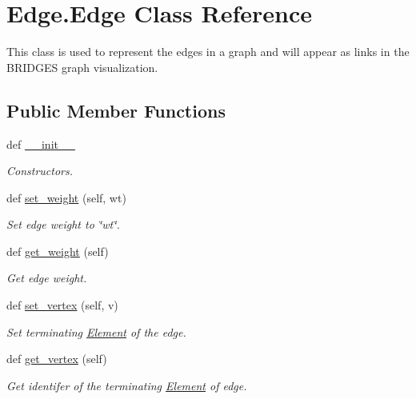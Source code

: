 \hypertarget{class_edge_1_1_edge}{}\section{Edge.\+Edge Class Reference}
\label{class_edge_1_1_edge}


This class is used to represent the edges in a graph and will appear as links in the B\+R\+I\+D\+G\+E\+S graph visualization.  


\subsection*{Public Member Functions}
\begin{DoxyCompactItemize}
\item 
def \hyperlink{class_edge_1_1_edge_a8852f95a1f4a541b359c0d498aeea264}{\+\_\+\+\_\+init\+\_\+\+\_\+}
\begin{DoxyCompactList}\small\item\em Constructors. \end{DoxyCompactList}\item 
def \hyperlink{class_edge_1_1_edge_a00a5bb637975a294dfabc0472ccea283}{set\+\_\+weight} (self, wt)
\begin{DoxyCompactList}\small\item\em Set edge weight to \char`\"{}wt\char`\"{}. \end{DoxyCompactList}\item 
def \hyperlink{class_edge_1_1_edge_a35a3ba198529f194a234c7aaeb1f5dce}{get\+\_\+weight} (self)
\begin{DoxyCompactList}\small\item\em Get edge weight. \end{DoxyCompactList}\item 
def \hyperlink{class_edge_1_1_edge_a8ff5ba90a5163d16d2027dc854cb912f}{set\+\_\+vertex} (self, v)
\begin{DoxyCompactList}\small\item\em Set terminating \hyperlink{namespace_element}{Element} of the edge. \end{DoxyCompactList}\item 
def \hyperlink{class_edge_1_1_edge_a5a1298a3bec02315ee7ba2c6ee931808}{get\+\_\+vertex} (self)
\begin{DoxyCompactList}\small\item\em Get identifer of the terminating \hyperlink{namespace_element}{Element} of edge. \end{DoxyCompactList}\item 

\end{DoxyCompactItemize}
